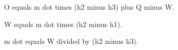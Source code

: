 O equals m dot times (h2 minus h3) plus Q minus W.  

W equals m dot times (h2 minus h1).  

m dot equals W divided by (h2 minus h3).